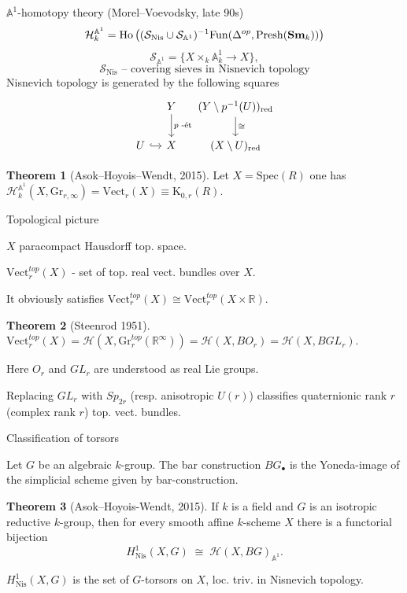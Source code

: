 \documentclass[handout]{beamer} %
\newcommand{\catname}[1]{{\normalfont\textbf{#1}}}
\theoremstyle{definition}
\newtheorem*{thm}{Theorem}
\begin{document}
\begin{frame}{$\mathbb{A}^1$-homotopy theory (Morel--Voevodsky, late 90s)}
 \[\mathcal{H}_{k}^{\mathbb{A}^1} = \mathrm{Ho}\left( (\mathcal{S}_\mathrm{Nis} \cup \mathcal{S}_{\mathbb{A}^1})^{-1} \mathrm{Fun}(\Delta^{op}, \mathrm{Presh}(\catname{Sm}_k)) \right)\]
 \pause
 \[\mathcal{S}_{\mathbb{A}^1} = \{ X \times_k \mathbb{A}^1_k \to X\}, \]
 \pause
 \[\mathcal{S}_\mathrm{Nis}\text{ -- covering sieves in Nisnevich topology} \]
 \pause
 Nisnevich topology is generated by the following squares
 \[ \begin{tikzcd}[ampersand replacement=\&, column sep=1.1em] \& Y \arrow{d}{p\text{ -{\'e}t}} \& (Y \setminus p^{-1}(U))_\mathrm{red} \arrow{d}{\cong} \\ U \arrow[r, hookrightarrow] \& X \& (X \setminus U)_\mathrm{red} \end{tikzcd}\]
 \pause

 \begin{thm}[Asok--Hoyois--Wendt, 2015]
  Let $X = \mathrm{Spec}(R)$ one has $\mathcal{H}_{k}^{\mathbb{A}^1}(X, \mathrm{Gr}_{r, \infty}) = \mathrm{Vect}_{r}(X) \equiv \mathrm{K}_{0, r}(R).$
 \end{thm}

\end{frame}

\begin{frame}{Topological picture}

$X$ paracompact Hausdorff top. space.
\pause

$\mathrm{Vect}^{top}_{r}(X)$ - set of top. real vect. bundles over $X$.
\pause

It obviously satisfies $\mathrm{Vect}^{top}_{r}(X) \cong \mathrm{Vect}^{top}_{r}(X \times \mathbb{R})$.
\pause

\begin{thm}[Steenrod 1951]
 \(\mathrm{Vect}^{top}_{r}(X) = \mathcal{H}(X, \mathrm{Gr}^{top}_{r}(\mathbb{R}^\infty)) = \mathcal{H}(X, BO_r) = \mathcal{H}(X, BGL_r).\)
\end{thm}
\pause

Here $O_r$ and $GL_r$ are understood as real Lie groups.
\pause

Replacing $GL_r$ with $Sp_{2r}$ (resp. anisotropic $U(r)$) classifies quaternionic rank $r$ (complex rank $r$) top. vect. bundles.
\end{frame}

\begin{frame}{Classification of torsors}

Let $G$ be an algebraic $k$-group. The bar construction $BG_\bullet$ is the Yoneda-image of the simplicial scheme given by bar-construction.
\pause

\begin{thm}[Asok--Hoyois-Wendt, 2015] If $k$ is a field and $G$ is an isotropic reductive $k$-group, then for every smooth affine $k$-scheme $X$ there is a functorial bijection
\[
H^1_{\mathrm{Nis}}(X,G) \;\cong\; \mathcal{H}(X,BG)_{\mathbb{A}^1}.
\]
\end{thm}
\pause
$H^1_{\mathrm{Nis}}(X,G)$ is the set of $G$-torsors on $X$, loc. triv. in Nisnevich topology.
\end{frame}
\end{document}
